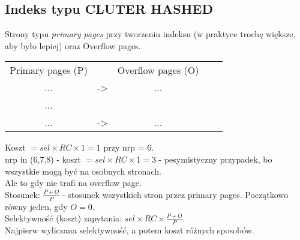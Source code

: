 \documentclass[a4paper,twoside]{article}
\begin{document}
  	\subsection*{Indeks typu CLUTER HASHED}
  	Strony typu \textit{primary pages} przy tworzeniu indeksu (w praktyce trochę większe, aby było lepiej) oraz Overflow pages.\\
  	\begin{table}[h]
  		\begin{tabular}{|c|lcll}
  			\cline{1-1}
  			\multicolumn{1}{|l|}{Primary pages (P)} &                                    & \multicolumn{1}{l}{Overflow pages (O)} &  &  \\ \cline{1-1} \cline{3-3}
  			...                                     & \multicolumn{1}{l|}{-\textgreater} & \multicolumn{1}{c|}{...}               &  &  \\ \cline{1-1} \cline{3-3}
  			...                                     &                                    &                                        &  &  \\ \cline{1-1} \cline{3-3}
  			...                                     & \multicolumn{1}{l|}{-\textgreater} & \multicolumn{1}{c|}{...}               &  &  \\ \cline{1-1} \cline{3-3}
  		\end{tabular}
  	\end{table}
  	Koszt $ = sel\times RC\times 1 = 1 $ przy nrp = 6.\\
  	nrp in (6,7,8) - koszt $ = sel\times RC\times 1 = 3 $ - pesymistyczny przypadek, bo wszystkie mogą być na osobnych stronach.\\
  	Ale to gdy nie trafi na overflow page.\\
  	Stosunek: $ \frac{P+O}{P} $ - stosunek wszystkich stron przez primary pages. Początkowo równy jeden, gdy $ O = 0 $.\\
  	Selektywność (koszt) zapytania: $ sel\times RC\times \frac{P+O}{P} $.\\
  	Najpierw wyliczana selektywność, a potem koszt różnych sposobów.
  	
\end{document}
